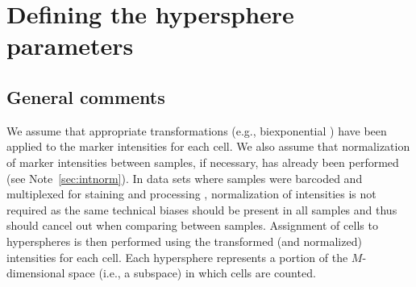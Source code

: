 \documentclass{article}
\begin{document}
%
%
%
%
%
%
%
%

\section{Defining the hypersphere parameters}

\subsection{General comments}
We assume that appropriate transformations (e.g., biexponential \cite{parks2006new}) have been applied to the marker intensities for each cell.
We also assume that normalization of marker intensities between samples, if necessary, has already been performed (see Note~\ref{sec:intnorm}).
In data sets where samples were barcoded and multiplexed for staining and processing \cite{zunder2015palladium}, normalization of intensities is not required as the same technical biases should be present in all samples and thus should cancel out when comparing between samples.
Assignment of cells to hyperspheres is then performed using the transformed (and normalized) intensities for each cell.
Each hypersphere represents a portion of the $M$-dimensional space (i.e., a subspace) in which cells are counted.
\end{document}
